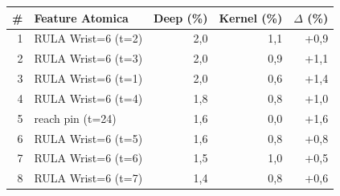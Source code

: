 \begin{tabular*}{\linewidth}{@{}r@{\extracolsep{\fill}}lrrr@{}}
\toprule
\textbf{\#} & \textbf{Feature Atomica} & \textbf{Deep (\%)} & \textbf{Kernel (\%)} & \textbf{$\Delta$ (\%)} \\
\midrule
1 & RULA Wrist=6 (t=2) & 2{,}0 & 1{,}1 & +0{,}9 \\
2 & RULA Wrist=6 (t=3) & 2{,}0 & 0{,}9 & +1{,}1 \\
3 & RULA Wrist=6 (t=1) & 2{,}0 & 0{,}6 & +1{,}4 \\
4 & RULA Wrist=6 (t=4) & 1{,}8 & 0{,}8 & +1{,}0 \\
5 & reach pin (t=24) & 1{,}6 & 0{,}0 & +1{,}6 \\
6 & RULA Wrist=6 (t=5) & 1{,}6 & 0{,}8 & +0{,}8 \\
7 & RULA Wrist=6 (t=6) & 1{,}5 & 1{,}0 & +0{,}5 \\
8 & RULA Wrist=6 (t=7) & 1{,}4 & 0{,}8 & +0{,}6 \\
\bottomrule
\end{tabular*}
